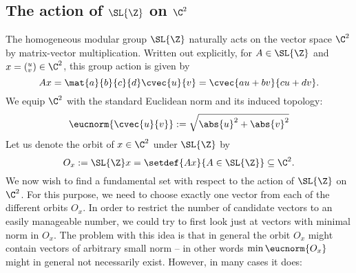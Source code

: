 \subsection{The action of $\SL{\Z}$ on $\C^2$}

The homogeneous modular group $\SL{\Z}$ naturally acts on the vector space $\C^2$ by matrix-vector multiplication. Written out explicitly, for $A \in \SL{\Z}$ and $x = ({}^u_v) \in \C^2$, this group action is given by
\begin{equation*}
A x = \mat{a}{b}{c}{d} \cvec{u}{v} = \cvec{a u + b v}{c u + d v}.
\end{equation*}
We equip $\C^2$ with the standard Euclidean norm and its induced topology:
\begin{equation*}
\eucnorm{\cvec{u}{v}} := \sqrt{\abs{u}^2 + \abs{v}^2}
\end{equation*}
Let us denote the orbit of $x \in \C^2$ under $\SL{\Z}$ by 
\begin{equation}
O_x := \SL{\Z} x = \setdef{Ax}{A \in \SL{\Z}} \subseteq \C^2.
\end{equation}
We now wish to find a fundamental set with respect to the action of $\SL{\Z}$ on $\C^2$. For this purpose, we need to choose exactly one vector from each of the different orbits $O_x$. In order to restrict the number of candidate vectors to an easily manageable number, we could try to first look just at vectors with minimal norm in $O_x$. The problem with this idea is that in general the orbit $O_x$ might contain vectors of arbitrary small norm -- in other words $\min{\eucnorm{O_x}}$ might in general not necessarily exist. However, in many cases it does:

